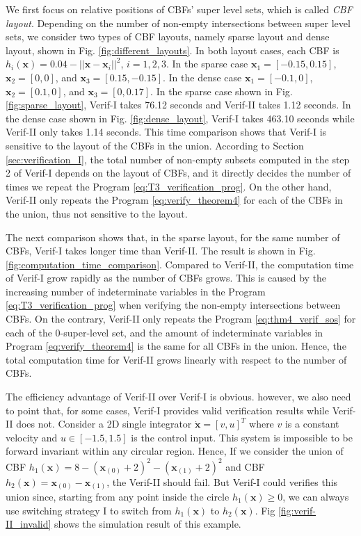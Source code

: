 \documentclass[letterpaper, 10 pt, conference]{ieeeconf}  %
\begin{document}
We first focus on relative positions of CBFs' super level sets, which is called \textit{CBF layout}. Depending on the number of non-empty intersections between super level sets, we consider two types of CBF layouts, namely sparse layout and dense layout, shown in Fig. \ref{fig:different_layouts}. In both layout cases, each CBF is $h_i(\mathbf{x}) = 0.04 - ||\mathbf{x}-\mathbf{x}_i||^2$, $i=1,2,3$. In the sparse case $\mathbf{x}_1 = [-0.15, 0.15]$, $\mathbf{x}_2 = [0, 0]$, and $\mathbf{x}_3 = [0.15, -0.15]$. In the dense case $\mathbf{x}_1 = [-0.1, 0]$, $\mathbf{x}_2 = [0.1, 0]$, and $\mathbf{x}_3 = [0, 0.17]$. In the sparse case shown in Fig. \eqref{fig:sparse_layout}, Verif-I takes 76.12 seconds and Verif-II takes 1.12 seconds. In the dense case shown in Fig. \eqref{fig:dense_layout}, Verif-I takes 463.10 seconds while Verif-II only takes 1.14 seconds. This time comparison shows that Verif-I is sensitive to the layout of the CBFs in the union. According to Section \ref{sec:verification_I}, the total number of non-empty subsets computed in the step 2 of Verif-I depends on the layout of CBFs, and it directly decides the number of times we repeat the Program \eqref{eq:T3_verification_prog}. On the other hand, Verif-II only repeats the Program \eqref{eq:verify_theorem4} for each of the CBFs in the union, thus not sensitive to the layout.

The next comparison shows that, in the sparse layout, for the same number of CBFs, Verif-I takes longer time than Verif-II. The result is shown in Fig. \ref{fig:computation_time_comparison}. Compared to Verif-II, the computation time of Verif-I grow rapidly as the number of CBFs grows. This is caused by the increasing number of indeterminate variables in the Program \eqref{eq:T3_verification_prog} when verifying the non-empty intersections between CBFs. On the contrary, Verif-II only repeats the Program \eqref{eq:thm4_verif_sos} for each of the 0-super-level set, and the amount of indeterminate variables in Program \eqref{eq:verify_theorem4} is the same for all CBFs in the union. Hence, the total computation time for Verif-II grows linearly with respect to the number of CBFs. 

The efficiency advantage of Verif-II over Verif-I is obvious. however, we also need to point that, for some cases, Verif-I provides valid verification results while Verif-II does not. Consider a 2D single integrator $\dot{\mathbf{x}} = [v, u]^T$ where $v$ is a constant velocity and $u\in[-1.5, 1.5]$ is the control input. This system is impossible to be forward invariant within any circular region. Hence, If we consider the union of CBF $h_1(\mathbf{x}) = 8 - (\mathbf{x}_{(0)} + 2)^2 - (\mathbf{x}_{(1)} + 2)^2$ and CBF $h_2(\mathbf{x}) = \mathbf{x}_{(0)} - \mathbf{x}_{(1)}$, the Verif-II should fail. But Verif-I could verifies this union since, starting from any point inside the circle $h_1(\mathbf{x})\geq 0$, we can always use switching strategy I to switch from $h_1(\mathbf{x})$ to $h_2(\mathbf{x})$. Fig \ref{fig:verif-II_invalid} shows the simulation result of this example.
\end{document}
